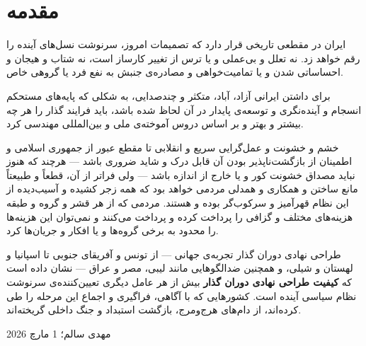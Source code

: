 \chapter{مقدمه}
ایران در مقطعی تاریخی قرار دارد که تصمیمات امروز، سرنوشت نسل‌های آینده را رقم خواهد زد. نه تعلل و بی‌عملی و یا ترس از تغییر کارساز است، نه شتاب و هیجان و احساساتی شدن و یا تمامیت‌خواهی و مصادره‌ی جنبش به نفع فرد یا گروهی خاص.

برای داشتن ایرانی آزاد، آباد، متکثر و چندصدایی، به شکلی که پایه‌های مستحکم انسجام و آینده‌نگری و توسعه‌ی پایدار در آن لحاظ شده باشد، باید فرایند گذار را هر چه بیشتر و بهتر و بر اساس دروس آموخته‌ی ملی و بین‌المللی مهندسی کرد.

خشم و خشونت و عمل‌گرایی سریع و انقلابی تا مقطع عبور از جمهوری اسلامی و اطمینان از بازگشت‌ناپذیر بودن آن قابل درک و شاید ضروری باشد — هرچند که هنوز نباید مصداق خشونت کور و یا خارج از اندازه باشد — ولی فراتر از آن، قطعاً و طبیعتاً مانع ساختن و همکاری و همدلی مردمی خواهد بود که همه زجر کشیده و آسیب‌دیده از این نظام قهرآمیز و سرکوب‌گر بوده و هستند. مردمی که از هر قشر و گروه و طبقه هزینه‌های مختلف و گزافی را پرداخت کرده و پرداخت می‌کنند و نمی‌توان این هزینه‌ها را محدود به برخی گروه‌ها و یا افکار و جریان‌ها کرد.

\begin{modernbox}{طراحی نهادی دوران گذار}
تجربه‌ی جهانی — از تونس و آفریقای جنوبی تا اسپانیا و لهستان و شیلی، و همچنین ضدالگوهایی مانند لیبی، مصر و عراق — نشان داده است که \textbf{کیفیت طراحی نهادی دوران گذار} بیش از هر عامل دیگری تعیین‌کننده‌ی سرنوشت نظام سیاسی آینده است. کشورهایی که با آگاهی، فراگیری و اجماع این مرحله را طی کرده‌اند، از دام‌های هرج‌ومرج، بازگشت استبداد و جنگ داخلی گریخته‌اند.
\end{modernbox}

\begin{center}
    \href{https://mahdisalem.com/documents/statements/Mahestan/Mahestan_2Pages_Summary.pdf}{
    }
\end{center}
مهدی سالم؛ 1 مارچ 2026